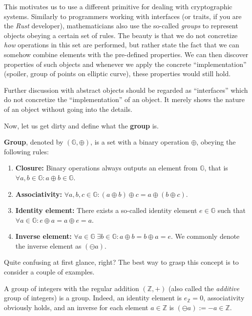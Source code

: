 \documentclass[../lecture-notes.tex]{subfiles}
\begin{document}
This motivates us to use a different primitive for dealing with cryptographic systems. Similarly to programmers working with interfaces (or traits, if you are the \textit{Rust} developer), mathematicians also use the so-called \textit{groups} to represent objects obeying a certain set of rules. The beauty is that we do not concretize \textit{how} operations in this set are performed, but rather state the fact that we can somehow combine elements with the pre-defined properties. We can then discover properties of such objects and whenever we apply the concrete ``implementation'' (spoiler, group of points on elliptic curve), these properties would still hold.

\begin{remark}
    Further discussion with abstract objects should be regarded as ``interfaces'' which do not concretize the ``implementation'' of an object. It merely shows the nature of an object without going into the details.
\end{remark}

Now, let us get dirty and define what the \textbf{group} is.

\begin{definition}
    \textbf{Group}, denoted by $(\mathbb{G}, \oplus)$, is a set with a binary operation $\oplus$, obeying the following rules:
    \begin{enumerate}
        \item \textbf{Closure:} Binary operations always outputs an element from $\mathbb{G}$, that is $\forall a,b \in \mathbb{G}: a \oplus b \in \mathbb{G}$.
        \item \textbf{Associativity:} $\forall a,b,c \in \mathbb{G}: (a \oplus b)\oplus c = a \oplus (b \oplus c)$.
        \item \textbf{Identity element:} There exists a so-called identity element $e \in \mathbb{G}$ such that $\forall a \in \mathbb{G}: e \oplus a = a \oplus e = a$.
        \item \textbf{Inverse element:} $\forall a \in \mathbb{G} \; \exists b \in \mathbb{G}: a\oplus b = b \oplus a = e$. We commonly denote the inverse element as $(\ominus a)$.
    \end{enumerate}
\end{definition}

Quite confusing at first glance, right? The best way to grasp this concept is to consider a couple of examples.

\begin{example}
    A group of integers with the regular addition $(\mathbb{Z},+)$ (also called the \textit{additive} group of integers) is a group. Indeed, an identity element is $e_{\mathbb{Z}}=0$, associativity obviously holds, and an inverse for each element $a \in \mathbb{Z}$ is $(\ominus a) := -a \in \mathbb{Z}$. 
\end{example}
\end{document}
